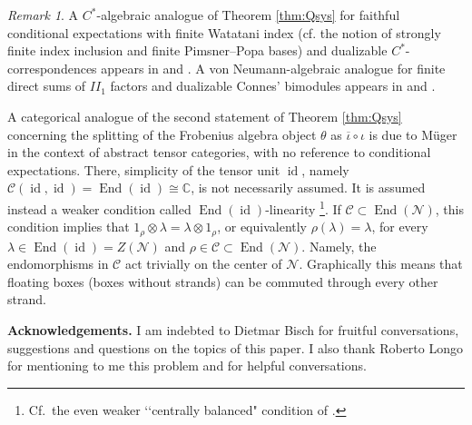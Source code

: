 \documentclass[11pt,a4paper]{article}
\makeatletter
\newcommand{\iotabar}{{\overline{\iota}}}
\newcommand{\C}{\mathcal{C}}
\newcommand{\N}{\mathcal{N}}
\newcommand{\CC}{\mathbb{C}}
\DeclareMathOperator{\End}{End}
\DeclareMathOperator{\id}{id}
\def\II{{I\!I}}%
\newcommand{\lqq}{\lq\lq}
\DeclareRobustCommand{\cf}{cf.\@\xspace}
\DeclareRobustCommand{\Sec}{Sec.\@\xspace}
\DeclareRobustCommand{\Prop}{Prop.\@\xspace}
\DeclareRobustCommand{\Lem}{Lem.\@\xspace}
\DeclareRobustCommand{\Cor}{Cor.\@\xspace}
\DeclareRobustCommand{\Thm}{Thm.\@\xspace}
\DeclareRobustCommand{\Ex}{Ex.\@\xspace}
\DeclareRobustCommand{\Def}{Def.\@\xspace}
\newcommand{\Cstar}{$C^\ast$\@\xspace}
\theoremstyle{plain}
\theoremstyle{definition}
\theoremstyle{remark}
\newtheorem{rmk}[thm]{Remark}
\numberwithin{equation}{section}%
\makeatother
\begin{document}
\begin{rmk}
A \Cstar-algebraic analogue of Theorem \ref{thm:Qsys} for faithful conditional expectations with finite Watatani index \cite[\Def 1.2.2]{Wat90} (\cf the notion of strongly finite index inclusion \cite[\Def 3.6]{BDH88} and finite Pimsner--Popa bases) 
and dualizable \Cstar-correspondences \cite[\Sec 4]{KPW03} appears in \cite[\Ex 3.10, \Ex 3.12]{CHPJP21} and \cite[\Prop 4.16, \Cor 4.17]{CHPJP21}. A von Neumann-algebraic analogue for finite direct sums of $\II_1$ factors and dualizable Connes' bimodules \cite[\Sec 4]{BDH14} appears in \cite[\Sec 3]{GiYu20} and \cite[\Lem 4.1]{GiYu20}.

A categorical analogue of the second statement of Theorem \ref{thm:Qsys} concerning the splitting of the Frobenius algebra object $\theta$ as $\iotabar\circ\iota$ is due to M\"uger \cite[\Thm 3.11]{Mue03-I} in the context of abstract tensor categories, with no reference to conditional expectations. There, simplicity of the tensor unit $\id$, namely $\C(\id,\id)=\End(\id)\cong\CC$, is not necessarily assumed. It is assumed instead a weaker condition called $\End(\id)$-linearity \cite[\Def-\Prop 3.10]{Mue03-I} \footnote{Cf.\ the even weaker \lqq centrally balanced" condition of \cite[\Def 2.13]{Zit07}.}. 
If $\C\subset\End(\N)$, this condition implies that $1_\rho \otimes \lambda = \lambda \otimes 1_\rho$, or equivalently $\rho(\lambda) = \lambda$, for every $\lambda\in \End(\id) = Z(\N)$ and $\rho\in\C\subset\End(\N)$. Namely, the endomorphisms in $\C$ act trivially on the center of $\N$. 
Graphically this means that floating boxes (boxes without strands) can be commuted through every other strand.
\end{rmk}

\bigskip
\noindent
{\bf Acknowledgements.}
I am indebted to Dietmar Bisch for fruitful conversations, suggestions and questions on the topics of this paper. I also thank Roberto Longo for mentioning to me this problem and for helpful conversations.


\small

\end{document}
